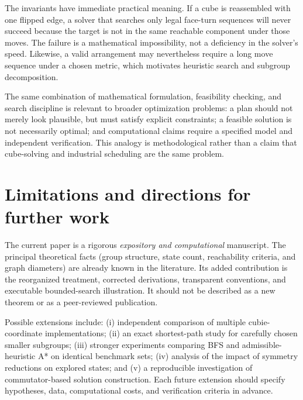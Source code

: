 \documentclass[11pt,a4paper]{article}
\theoremstyle{definition}
\theoremstyle{remark}
\begin{document}
The invariants have immediate practical meaning. If a cube is reassembled with one flipped edge, a solver that searches only legal face-turn sequences will never succeed because the target is not in the same reachable component under those moves. The failure is a mathematical impossibility, not a deficiency in the solver's speed. Likewise, a valid arrangement may nevertheless require a long move sequence under a chosen metric, which motivates heuristic search and subgroup decomposition.

The same combination of mathematical formulation, feasibility checking, and search discipline is relevant to broader optimization problems: a plan should not merely look plausible, but must satisfy explicit constraints; a feasible solution is not necessarily optimal; and computational claims require a specified model and independent verification. This analogy is methodological rather than a claim that cube-solving and industrial scheduling are the same problem.

\section{Limitations and directions for further work}
The current paper is a rigorous \emph{expository and computational} manuscript. The principal theoretical facts (group structure, state count, reachability criteria, and graph diameters) are already known in the literature. Its added contribution is the reorganized treatment, corrected derivations, transparent conventions, and executable bounded-search illustration. It should not be described as a new theorem or as a peer-reviewed publication.

Possible extensions include: (i) independent comparison of multiple cubie-coordinate implementations; (ii) an exact shortest-path study for carefully chosen smaller subgroups; (iii) stronger experiments comparing BFS and admissible-heuristic A* on identical benchmark sets; (iv) analysis of the impact of symmetry reductions on explored states; and (v) a reproducible investigation of commutator-based solution construction. Each future extension should specify hypotheses, data, computational costs, and verification criteria in advance.
\end{document}
